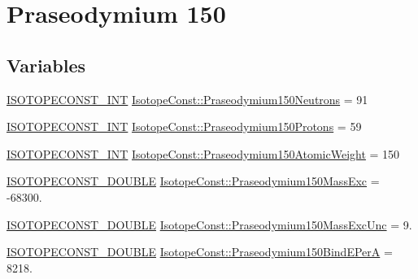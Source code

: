 \hypertarget{group___isotope_const-_praseodymium-_pr150}{}\section{Praseodymium 150}
\label{group___isotope_const-_praseodymium-_pr150}
\subsection*{Variables}
\begin{DoxyCompactItemize}
\item 
\mbox{\hyperlink{group___isotope_const-_macros_ga5f18360b3e99483a35c32d789e62621c}{I\+S\+O\+T\+O\+P\+E\+C\+O\+N\+S\+T\+\_\+\+I\+NT}} \mbox{\hyperlink{group___isotope_const-_praseodymium-_pr150_ga893313ccabf30a0709660ae0ca45c45b}{Isotope\+Const\+::\+Praseodymium150\+Neutrons}} = 91
\item 
\mbox{\hyperlink{group___isotope_const-_macros_ga5f18360b3e99483a35c32d789e62621c}{I\+S\+O\+T\+O\+P\+E\+C\+O\+N\+S\+T\+\_\+\+I\+NT}} \mbox{\hyperlink{group___isotope_const-_praseodymium-_pr150_ga8b6cdbec4ad836fe93ed1d77fdd4ee84}{Isotope\+Const\+::\+Praseodymium150\+Protons}} = 59
\item 
\mbox{\hyperlink{group___isotope_const-_macros_ga5f18360b3e99483a35c32d789e62621c}{I\+S\+O\+T\+O\+P\+E\+C\+O\+N\+S\+T\+\_\+\+I\+NT}} \mbox{\hyperlink{group___isotope_const-_praseodymium-_pr150_gae18653aa7c9126e4473e90d2b91e099b}{Isotope\+Const\+::\+Praseodymium150\+Atomic\+Weight}} = 150
\item 
\mbox{\hyperlink{group___isotope_const-_macros_ga8f45a7272ce02c0b4c65c44636ed719a}{I\+S\+O\+T\+O\+P\+E\+C\+O\+N\+S\+T\+\_\+\+D\+O\+U\+B\+LE}} \mbox{\hyperlink{group___isotope_const-_praseodymium-_pr150_ga0ad550b78d6650c1a92abb3ddd15448d}{Isotope\+Const\+::\+Praseodymium150\+Mass\+Exc}} = -\/68300.
\item 
\mbox{\hyperlink{group___isotope_const-_macros_ga8f45a7272ce02c0b4c65c44636ed719a}{I\+S\+O\+T\+O\+P\+E\+C\+O\+N\+S\+T\+\_\+\+D\+O\+U\+B\+LE}} \mbox{\hyperlink{group___isotope_const-_praseodymium-_pr150_ga77fdb0fb9fc40f316d586afd78ab5f36}{Isotope\+Const\+::\+Praseodymium150\+Mass\+Exc\+Unc}} = 9.
\item 
\mbox{\hyperlink{group___isotope_const-_macros_ga8f45a7272ce02c0b4c65c44636ed719a}{I\+S\+O\+T\+O\+P\+E\+C\+O\+N\+S\+T\+\_\+\+D\+O\+U\+B\+LE}} \mbox{\hyperlink{group___isotope_const-_praseodymium-_pr150_gaab1d3f04b1fc808bada614ed9a28cc65}{Isotope\+Const\+::\+Praseodymium150\+Bind\+E\+PerA}} = 8218.

\end{DoxyCompactItemize}
